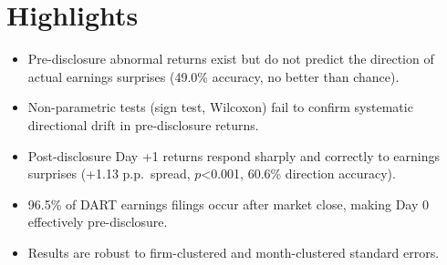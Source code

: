 \documentclass[12pt]{article}
\begin{document}
\section*{Highlights}

\begin{itemize}
\item Pre-disclosure abnormal returns exist but do not predict the direction of actual earnings surprises (49.0\% accuracy, no better than chance).
\item Non-parametric tests (sign test, Wilcoxon) fail to confirm systematic directional drift in pre-disclosure returns.
\item Post-disclosure Day +1 returns respond sharply and correctly to earnings surprises (+1.13 p.p.\ spread, $p$<0.001, 60.6\% direction accuracy).
\item 96.5\% of DART earnings filings occur after market close, making Day 0 effectively pre-disclosure.
\item Results are robust to firm-clustered and month-clustered standard errors.
\end{itemize}
\end{document}
